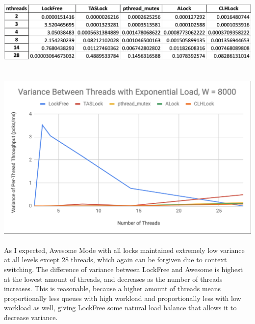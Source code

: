 \documentclass{article}
\begin{document}
\begin{adjustwidth}{-2cm}{-2cm}
\null\\
\includegraphics[width=\linewidth]{b_awefairData.png}\\ \null\\
\null\\
\includegraphics[width=\linewidth]{b_awefairGraph.png}\\ \null\\
As I expected, Awesome Mode with all locks maintained extremely low variance at all levels except 28 threads, which again can be forgiven due to context switching. The difference of variance between LockFree and Awesome is highest at the lowest amount of threads, and decreases as the number of threads increases. This is reasonable, because a higher amount of threads means proportionally less queues with high workload and proportionally less with low workload as well, giving LockFree some natural load balance that allows it to decrease variance.
\end{adjustwidth}
\end{document}
